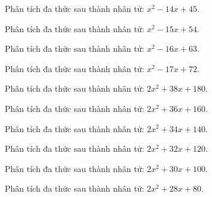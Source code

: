 \begin{bt}
	Phân tích đa thức sau thành nhân tử: $x^2 - 14 x + 45$.
\end{bt}
\begin{bt}
	Phân tích đa thức sau thành nhân tử: $x^2 - 15 x + 54$.
\end{bt}
\begin{bt}
	Phân tích đa thức sau thành nhân tử: $x^2 - 16 x + 63$.
\end{bt}
\begin{bt}
	Phân tích đa thức sau thành nhân tử: $x^2 - 17 x + 72$.
\end{bt}
\begin{bt}
	Phân tích đa thức sau thành nhân tử: $2 x^2 + 38 x + 180$.
\end{bt}
\begin{bt}
	Phân tích đa thức sau thành nhân tử: $2 x^2 + 36 x + 160$.
\end{bt}
\begin{bt}
	Phân tích đa thức sau thành nhân tử: $2 x^2 + 34 x + 140$.
\end{bt}
\begin{bt}
	Phân tích đa thức sau thành nhân tử: $2 x^2 + 32 x + 120$.
\end{bt}
\begin{bt}
	Phân tích đa thức sau thành nhân tử: $2 x^2 + 30 x + 100$.
\end{bt}
\begin{bt}
	Phân tích đa thức sau thành nhân tử: $2 x^2 + 28 x + 80$.
\end{bt}
